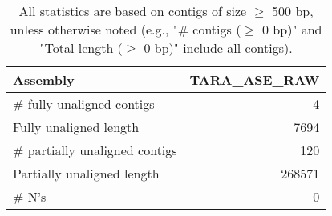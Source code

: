 \documentclass[12pt,a4paper]{article}
\begin{document}
\begin{table}[ht]
\begin{center}
\caption{All statistics are based on contigs of size $\geq$ 500 bp, unless otherwise noted (e.g., "\# contigs ($\geq$ 0 bp)" and "Total length ($\geq$ 0 bp)" include all contigs).}
\begin{tabular}{|l*{1}{|r}|}
\hline
Assembly & TARA\_ASE\_RAW \\ \hline
\# fully unaligned contigs & 4 \\ \hline
Fully unaligned length & 7694 \\ \hline
\# partially unaligned contigs & 120 \\ \hline
Partially unaligned length & 268571 \\ \hline
\# N's & 0 \\ \hline
\end{tabular}
\end{center}
\end{table}
\end{document}
